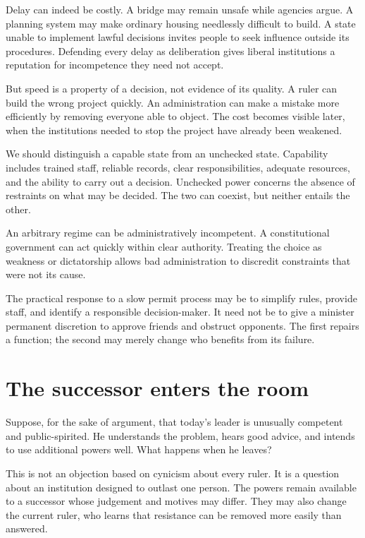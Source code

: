 \documentclass[12pt,a4paper]{book}
\begin{document}
Delay can indeed be costly. A bridge may remain unsafe while agencies argue. A planning system may make ordinary housing needlessly difficult to build. A state unable to implement lawful decisions invites people to seek influence outside its procedures. Defending every delay as deliberation gives liberal institutions a reputation for incompetence they need not accept.

But speed is a property of a decision, not evidence of its quality. A ruler can build the wrong project quickly. An administration can make a mistake more efficiently by removing everyone able to object. The cost becomes visible later, when the institutions needed to stop the project have already been weakened.

We should distinguish a capable state from an unchecked state. Capability includes trained staff, reliable records, clear responsibilities, adequate resources, and the ability to carry out a decision. Unchecked power concerns the absence of restraints on what may be decided. The two can coexist, but neither entails the other.

An arbitrary regime can be administratively incompetent. A constitutional government can act quickly within clear authority. Treating the choice as weakness or dictatorship allows bad administration to discredit constraints that were not its cause.

The practical response to a slow permit process may be to simplify rules, provide staff, and identify a responsible decision-maker. It need not be to give a minister permanent discretion to approve friends and obstruct opponents. The first repairs a function; the second may merely change who benefits from its failure.

\section*{The successor enters the room}

Suppose, for the sake of argument, that today's leader is unusually competent and public-spirited. He understands the problem, hears good advice, and intends to use additional powers well. What happens when he leaves?

This is not an objection based on cynicism about every ruler. It is a question about an institution designed to outlast one person. The powers remain available to a successor whose judgement and motives may differ. They may also change the current ruler, who learns that resistance can be removed more easily than answered.
\end{document}
